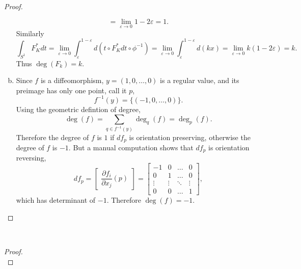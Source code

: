 \documentclass{article}
\newenvironment{problem}[2][Problem]{\begin{trivlist}
\item[\hskip \labelsep {\bfseries #1}\hskip \labelsep {\bfseries #2.}]}{\end{trivlist}}
\begin{document}
\begin{proof}
\begin{enumerate}[(a)]
\[          = \lim_{\varepsilon \rightarrow 0} 1 - 2\varepsilon
          = 1.
      \] Similarly \[
        \int_{S^1}F_K^*dt
          = \lim_{\varepsilon \rightarrow 0} \int_\varepsilon^{1 - \varepsilon} d(t \circ F_K^*dt \circ \phi^{-1})
          = \lim_{\varepsilon \rightarrow 0} \int_\varepsilon^{1 - \varepsilon} d(kx)
          = \lim_{\varepsilon \rightarrow 0} k(1 - 2\varepsilon)
          = k.
      \]
      Thus $\deg(F_k) = k$.
    \item Since $f$ is a diffeomorphism, $y = (1, 0, \hdots, 0)$ is a regular
    value, and its preimage has only one point, call it $p$, \[
      f^{-1}(y) = \{(-1, 0, \hdots, 0)\}.
    \]
    Using the geometric defintion of degree, \[
      \deg(f) = \sum_{q \in f^{-1}(y)} \deg_q(f) = \deg_p(f).
    \]
    Therefore the degree of $f$ is $1$ if $df_p$ is orientation preserving,
    otherwise the degree of $f$ is $-1$. But a manual computation shows that
    $df_p$ is orientation reversing,
    \[
      df_p
      = \begin{bmatrix}
        \dfrac{\partial f_i}{\partial x_j}(p)
      \end{bmatrix}
      = \begin{bmatrix}
        -1 & 0 & \hdots & 0\\
        0  & 1 & \hdots & 0\\
        \vdots  & \vdots & \ddots & \vdots\\
        0  & 0 & \hdots & 1
      \end{bmatrix},
    \] which has determinant of $-1$. Therefore $\deg(f) = -1.$
  \end{enumerate}
\end{proof}
\pagebreak

\begin{problem}{7} \text{} \\
\end{problem}

\begin{proof} \text{} \\
\end{proof}
\end{document}
